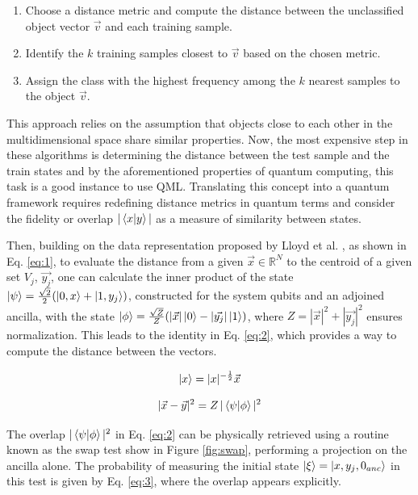 \documentclass{article}
\begin{document}
\begin{enumerate}
    \item Choose a distance metric and compute the distance between the unclassified object vector $\vec{v}$ and each training sample.
    \item Identify the $k$ training samples closest to $\vec{v}$ based on the chosen metric.
    \item Assign the class with the highest frequency among the $k$ nearest samples to the object $\vec{v}$.
\end{enumerate}

This approach relies on the assumption that objects close to each other in the multidimensional space share similar properties. Now, the most expensive step in these algorithms is determining the distance between
the test sample and the train states and by the aforementioned properties of quantum computing, this task is a good instance to use QML.
Translating this concept into a quantum framework requires redefining distance metrics in quantum terms and consider the fidelity or overlap
$|\braket{x|y}|$ as a measure of similarity between states. 

Then, building on the data representation proposed by Lloyd et al. \cite{Lloyd2013}, as shown in Eq. \ref{eq:1}, to evaluate the distance from a given $\vec{x} \in \mathbb{R}^N$ to the centroid of a given set $V_j$, $\vec{y_j}$, one can calculate the inner product of the state $\ket{\psi} = \frac{\sqrt{2}}{2} (\ket{0, x} + \ket{1,y_j})$, constructed for the system qubits and an adjoined ancilla, 
with the state $\ket{\phi} = \frac{\sqrt{Z}}{Z}(|\vec{x}|\ket{0} - |\vec{y_j}|\ket{1})$, where $Z = |\vec{x}|^2 + |\vec{y_j}|^2$ ensures normalization. This leads to the identity in Eq. \ref{eq:2}, which provides a way to compute the distance between the vectors.

\begin{equation}
    \ket{x} = |x|^{-\frac{1}{2}} \vec{x}
    \label{eq:1}
\end{equation}

\begin{equation}
    |\vec{x} - \vec{y}|^2 = Z \, |\braket{\psi | \phi}|^2
    \label{eq:2}
\end{equation}

The overlap $|\braket{\psi | \phi}|^2$ in Eq. \ref{eq:2} can be physically retrieved using a routine known as the swap test \cite{swaptest} show in Figure \ref{fig:swap}, 
performing a projection on the ancilla alone. The probability of measuring the initial state $\ket{\xi}=\ket{x, y_j, 0_{anc}}$ in this test is given by Eq. \ref{eq:3}, where the overlap appears explicitly.
\end{document}
